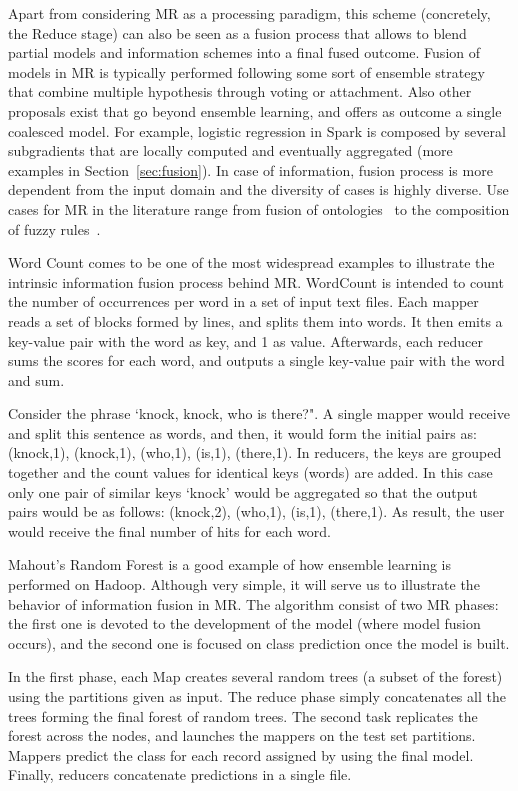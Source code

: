 \documentclass[3p,review]{elsarticle}
\begin{document}
Apart from considering MR as a processing paradigm, this scheme (concretely, the Reduce stage) can also be seen as a fusion process that allows to blend partial models and information schemes into a final fused outcome. Fusion of models in MR is typically performed following some sort of ensemble strategy that combine multiple hypothesis through voting or attachment. Also other proposals exist that go beyond ensemble learning, and offers as outcome a single coalesced model. For example, logistic regression in Spark is composed by several subgradients that are locally computed and eventually aggregated (more examples in Section~\ref{sec:fusion}). In case of information, fusion process is more dependent from the input domain and the diversity of cases is highly diverse. Use cases for MR in the literature range from fusion of ontologies~\cite{zhang14b} to the composition of fuzzy rules~\cite{rio15b}.

Word Count comes to be one of the most widespread examples to illustrate the intrinsic information fusion process behind MR. WordCount is intended to count the number of occurrences per word in a set of input text files. Each mapper reads a set of blocks formed by lines, and splits them into words. It then emits a key-value pair with the word as key, and 1 as value. Afterwards, each reducer sums the scores for each word, and outputs a single key-value pair with the word and sum. 

Consider the phrase `knock, knock, who is there?". A single mapper would receive and split this sentence as words, and then, it would form the initial pairs as: (knock,1), (knock,1), (who,1), (is,1), (there,1). In reducers, the keys are grouped together and the count values for identical keys (words) are added. In this case only one pair of similar keys `knock' would be aggregated so that the output pairs would be as follows: (knock,2), (who,1), (is,1), (there,1). As result, the user would receive the final number of hits for each word. 

Mahout's Random Forest is a good example of how ensemble learning is performed on Hadoop. Although very simple, it will serve us to illustrate the behavior of information fusion in MR. The algorithm consist of two MR phases: the first one is devoted to the development of the model (where model fusion occurs), and the second one is focused on class prediction once the model is built.

In the first phase, each Map creates several random trees (a subset of the forest) using the partitions given as input. The reduce phase simply concatenates all the trees forming the final forest of random trees. The second task replicates the forest across the nodes, and launches the mappers on the test set partitions. Mappers predict the class for each record assigned by using the final model. Finally, reducers concatenate predictions in a single file.
\end{document}
